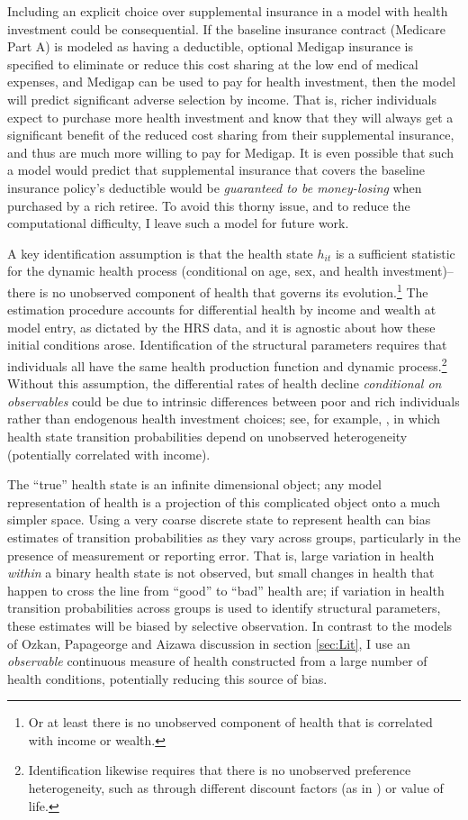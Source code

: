 \documentclass[12pt,pdftex,letterpaper]{article}
\newcommand{\Health}{h}
\begin{document}
Including an explicit choice over supplemental insurance in a model with health investment could be consequential.  If the baseline insurance contract (Medicare Part A) is modeled as having a deductible, optional Medigap insurance is specified to eliminate or reduce this cost sharing at the low end of medical expenses, and Medigap can be used to pay for health investment, then the model will predict significant adverse selection by income.  That is, richer individuals expect to purchase more health investment and know that they will always get a significant benefit of the reduced cost sharing from their supplemental insurance, and thus are much more willing to pay for Medigap.  It is even possible that such a model would predict that supplemental insurance that covers the baseline insurance policy's deductible would be \textit{guaranteed to be money-losing} when purchased by a rich retiree.  To avoid this thorny issue, and to reduce the computational difficulty, I leave such a model for future work.

A key identification assumption is that the health state $\Health_{it}$ is a sufficient statistic for the dynamic health  process (conditional on age, sex, and health investment)-- there is no unobserved component of health that governs its evolution.\footnote{Or at least there is no unobserved component of health that is correlated with income or wealth.}  The estimation procedure accounts for differential health by income and wealth at model entry, as dictated by the HRS data, and it is agnostic about how these initial conditions arose.  Identification of the structural parameters requires that individuals all have the same health production function and dynamic process.\footnote{Identification likewise requires that there is no unobserved preference heterogeneity, such as through different discount factors (as in \cite{cstwMPC}) or value of life.} Without this assumption, the differential rates of health decline \textit{conditional on observables} could be due to intrinsic differences between poor and rich individuals rather than endogenous health investment choices; see, for example, \cite{pashchenko18}, in which health state transition probabilities depend on unobserved heterogeneity (potentially correlated with income).

The ``true'' health state is an infinite dimensional object; any model representation of health is a projection of this complicated object onto a much simpler space.  Using a very coarse discrete state to represent health can bias estimates of transition probabilities as they vary across groups, particularly in the presence of measurement or reporting error.  That is, large variation in health \textit{within} a binary health state is not observed, but small changes in health that happen to cross the line from ``good'' to ``bad'' health are; if variation in health transition probabilities across groups is used to identify structural parameters, these estimates will be biased by selective observation.  In contrast to the models of Ozkan, Papageorge and Aizawa discussion in section \ref{sec:Lit}, I use an \textit{observable} continuous measure of health constructed from a large number of health conditions, potentially reducing this source of bias.
\end{document}

